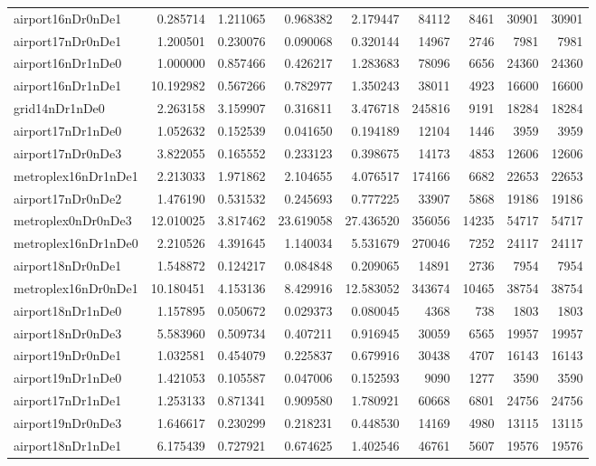 \begin{longtable}{|l|r|r|r|r|r|r|r|r|}
airport16nDr0nDe1 & 0.285714 & 1.211065 & 0.968382 & 2.179447 & 84112 & 8461 & 30901 & 30901 \\
airport17nDr0nDe1 & 1.200501 & 0.230076 & 0.090068 & 0.320144 & 14967 & 2746 & 7981 & 7981 \\
airport16nDr1nDe0 & 1.000000 & 0.857466 & 0.426217 & 1.283683 & 78096 & 6656 & 24360 & 24360 \\
airport16nDr1nDe1 & 10.192982 & 0.567266 & 0.782977 & 1.350243 & 38011 & 4923 & 16600 & 16600 \\
grid14nDr1nDe0 & 2.263158 & 3.159907 & 0.316811 & 3.476718 & 245816 & 9191 & 18284 & 18284 \\
airport17nDr1nDe0 & 1.052632 & 0.152539 & 0.041650 & 0.194189 & 12104 & 1446 & 3959 & 3959 \\
airport17nDr0nDe3 & 3.822055 & 0.165552 & 0.233123 & 0.398675 & 14173 & 4853 & 12606 & 12606 \\
metroplex16nDr1nDe1 & 2.213033 & 1.971862 & 2.104655 & 4.076517 & 174166 & 6682 & 22653 & 22653 \\
airport17nDr0nDe2 & 1.476190 & 0.531532 & 0.245693 & 0.777225 & 33907 & 5868 & 19186 & 19186 \\
metroplex0nDr0nDe3 & 12.010025 & 3.817462 & 23.619058 & 27.436520 & 356056 & 14235 & 54717 & 54717 \\
metroplex16nDr1nDe0 & 2.210526 & 4.391645 & 1.140034 & 5.531679 & 270046 & 7252 & 24117 & 24117 \\
airport18nDr0nDe1 & 1.548872 & 0.124217 & 0.084848 & 0.209065 & 14891 & 2736 & 7954 & 7954 \\
metroplex16nDr0nDe1 & 10.180451 & 4.153136 & 8.429916 & 12.583052 & 343674 & 10465 & 38754 & 38754 \\
airport18nDr1nDe0 & 1.157895 & 0.050672 & 0.029373 & 0.080045 & 4368 & 738 & 1803 & 1803 \\
airport18nDr0nDe3 & 5.583960 & 0.509734 & 0.407211 & 0.916945 & 30059 & 6565 & 19957 & 19957 \\
airport19nDr0nDe1 & 1.032581 & 0.454079 & 0.225837 & 0.679916 & 30438 & 4707 & 16143 & 16143 \\
airport19nDr1nDe0 & 1.421053 & 0.105587 & 0.047006 & 0.152593 & 9090 & 1277 & 3590 & 3590 \\
airport17nDr1nDe1 & 1.253133 & 0.871341 & 0.909580 & 1.780921 & 60668 & 6801 & 24756 & 24756 \\
airport19nDr0nDe3 & 1.646617 & 0.230299 & 0.218231 & 0.448530 & 14169 & 4980 & 13115 & 13115 \\
airport18nDr1nDe1 & 6.175439 & 0.727921 & 0.674625 & 1.402546 & 46761 & 5607 & 19576 & 19576 \\

\end{longtable}
